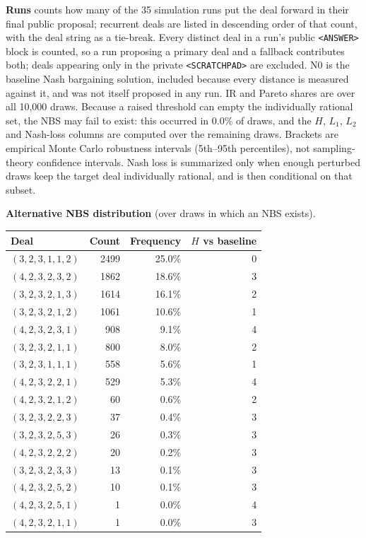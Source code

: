 \documentclass[9pt,a4paper]{article}
\begin{document}
\begin{landscape}
\textbf{Runs} counts how many of the 35 simulation runs put the deal forward in their final public proposal; recurrent deals are listed in descending order of that count, with the deal string as a tie-break. Every distinct deal in a run's public \texttt{<ANSWER>} block is counted, so a run proposing a primary deal and a fallback contributes both; deals appearing only in the private \texttt{<SCRATCHPAD>} are excluded. N0 is the baseline Nash bargaining solution, included because every distance is measured against it, and was not itself proposed in any run. IR and Pareto shares are over all 10,000 draws. Because a raised threshold can empty the individually rational set, the NBS may fail to exist: this occurred in 0.0\% of draws, and the $H$, $L_1$, $L_2$ and Nash-loss columns are computed over the remaining draws. Brackets are empirical Monte Carlo robustness intervals (5th--95th percentiles), not sampling-theory confidence intervals. Nash loss is summarized only when enough perturbed draws keep the target deal individually rational, and is then conditional on that subset.
\par\vspace{3mm}
\textbf{Alternative NBS distribution} (over draws in which an NBS exists).\par\vspace{1mm}
\begin{tabular}{@{}lrrr@{}}\toprule \textbf{Deal}&\textbf{Count}&\textbf{Frequency}&\textbf{$H$ vs baseline}\\\midrule
$(3,2,3,1,1,2)$ & 2499 & 25.0\% & 0\\
$(4,2,3,2,3,2)$ & 1862 & 18.6\% & 3\\
$(3,2,3,2,1,3)$ & 1614 & 16.1\% & 2\\
$(3,2,3,2,1,2)$ & 1061 & 10.6\% & 1\\
$(4,2,3,2,3,1)$ & 908 & 9.1\% & 4\\
$(3,2,3,2,1,1)$ & 800 & 8.0\% & 2\\
$(3,2,3,1,1,1)$ & 558 & 5.6\% & 1\\
$(4,2,3,2,2,1)$ & 529 & 5.3\% & 4\\
$(4,2,3,2,1,2)$ & 60 & 0.6\% & 2\\
$(3,2,3,2,2,3)$ & 37 & 0.4\% & 3\\
$(3,2,3,2,5,3)$ & 26 & 0.3\% & 3\\
$(4,2,3,2,2,2)$ & 20 & 0.2\% & 3\\
$(3,2,3,2,3,3)$ & 13 & 0.1\% & 3\\
$(4,2,3,2,5,2)$ & 10 & 0.1\% & 3\\
$(4,2,3,2,5,1)$ & 1 & 0.0\% & 4\\
$(4,2,3,2,1,1)$ & 1 & 0.0\% & 3\\
\bottomrule\end{tabular}
\end{landscape}
\end{document}
